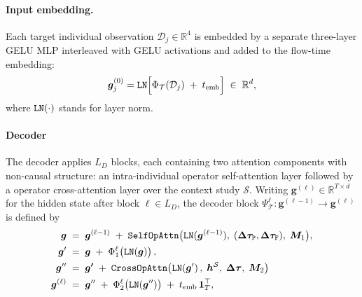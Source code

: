 \paragraph{Input embedding.}
Each target individual observation $\mathcal{D}_j \in \mathbb{R}^4$ is embedded by a separate three-layer GELU MLP interleaved with GELU activations and added to the flow-time embedding:
\begin{equation}
    \bm{g}^{(0)}_j
    = \mathtt{LN} \Bigl[
        \Phi_{\mathcal{T}}\!\left(\mathcal{D}_j\right)
        \;+\; t_{\rm emb}
    \Bigr]
    \;\in\; \mathbb{R}^d,
    \label{eq:enc_embed}
\end{equation}
where $\tt LN(\cdot)$ stands for layer norm.

\paragraph{Decoder}
The decoder applies $L_D$ blocks, each containing two attention components with non-causal structure: an intra-individual operator self-attention layer followed by a operator cross-attention layer over the context study $\mathcal{S}$. Writing $\bm{g}^{(\ell)} \in \mathbb{R}^{T \times d}$ for the hidden state after block $\ell\in L_{D}$, the decoder block $\Psi_\mathcal{T}^{\ell}:\bm{g}^{(\ell-1)}\to\bm{g}^{(\ell)}$ is defined by
\begin{align}
    \bm g &\;=\; \bm{g}^{(\ell-1)}
   \; +\; \mathtt{SelfOpAttn}\bigl(\mathtt{LN}(\bm{g}^{(\ell-1)}),\;(\bm{\Delta\tau}_{\tt P}, \bm{\Delta\tau}_{\tt F}),\;\bm{M}_1\bigr),
    \label{eq:enc_sa}\\
    \bm g^\prime &\;=\; \bm{g} \;+\; \Phi_1^{\ell}\bigl({\tt LN}(\bm{g})\bigr)\,,\\
    \bm g^{\prime\prime} &\;=\; \bm{g^{\prime}}
    \;+\; \mathtt{CrossOpAttn}\bigl(\mathtt{LN}(\bm g^\prime)\,,\; \bm{h}^{\mathcal{S}},\;\bm{\Delta\tau},\;\bm{M}_2\bigr)\\
    \bm g^{(\ell)} &\;=\; \bm{g}^{\prime\prime} \;+ \;\Phi_2^{\ell}\bigl({\tt LN}(\bm{g}^{\prime\prime})\bigr)\; + \;t_{\rm emb}\,\bm{1}^\top_T,
\end{align}

